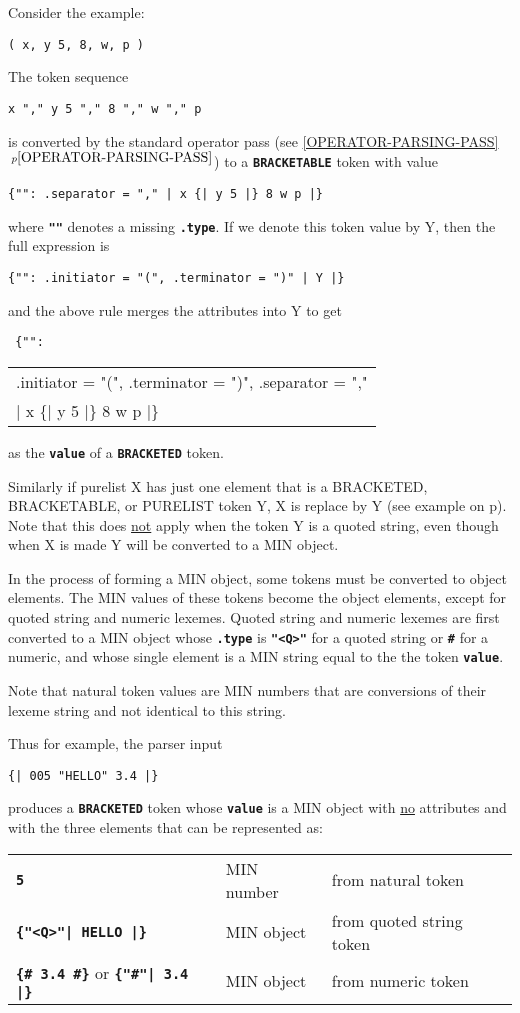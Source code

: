 \documentclass[12pt]{article}
\newcommand{\TT}[1]{{\tt \bfseries #1}}
\newcommand{\itemref}[1]{\ref{#1}$\,^{p\pageref{#1}}$}
\newcommand{\pagref}[1]{p\pageref{#1}}
\begin{document}
Consider the example:\label{EXAMPLE-BRACKETABLE-MERGE}
\begin{center}
\tt ( x, y 5, 8, w, p )
\end{center}

The token sequence
\begin{center}
\tt x "," y 5 "," 8 "," w "," p
\end{center}
is converted by the standard operator pass
(see \itemref{OPERATOR-PARSING-PASS})
to a \TT{BRACKETABLE} token with value
\begin{center}
\tt \{"": .separator = "," | x  \{| y 5 |\} 8 w p |\}
\end{center}
where \TT{""} denotes a missing \TT{.type}.
If we denote this token value by Y,
then the full expression is
\begin{center}
\tt \{"": .initiator = "(", .terminator = ")" | Y |\}
\end{center}
and the above rule merges the attributes into Y to get
\begin{center}
\tt
\{"": \begin{tabular}[t]{l}
      .initiator = "(", .terminator = ")", .separator = "," \\
      | x  \{| y 5 |\} 8 w p |\}
      \end{tabular}
\end{center}
as the \TT{value} of a \TT{BRACKETED} token.

Similarly if purelist X has just one element that is a BRACKETED,
BRACKETABLE, or PURE\-LIST token Y, X is replace by Y
(see example on \pagref{EXAMPLE-PURELIST-MERGE}).  Note that this does
\underline{not} apply when the token Y is a quoted string, even though
when X is made Y will be converted to a MIN object.

In the process of forming a MIN object, some tokens must be converted to
object elements.  The MIN values of these tokens become the object elements,
except for quoted string and numeric lexemes.
Quoted string and numeric lexemes
are first converted to a MIN object
whose \TT{.type} is \TT{"<Q>"} for a quoted string or \TT{\#} for
a numeric, and whose single element is a MIN string equal to the
the token \TT{value}.

Note that natural token values are MIN numbers that
are conversions of their lexeme string and not identical
to this string.

Thus for example, the parser input
\begin{center}
\tt \{| 005 "HELLO" 3.4 |\}
\end{center}
produces a \TT{BRACKETED} token whose \TT{value} is a MIN object with
\underline{no} attributes and with the three elements that
can be represented as:
\begin{center}
\begin{tabular}{lll}
\TT{5}	                        & MIN number	& from natural token \\
\TT{\{"<Q>"| HELLO |\}}		& MIN object	& from quoted string token \\
\TT{\{\# 3.4 \#\}} or \TT{\{"\#"| 3.4 |\}}
				& MIN object	& from numeric token \\
\end{tabular}
\end{center}
\end{document}
